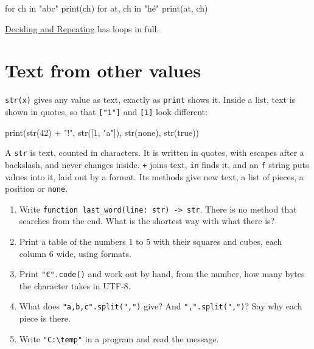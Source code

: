 \begin{zeno}
for ch in "abc" {
    print(ch)
}
for at, ch in "hé" {
    print(at, ch)
}
\end{zeno}

\hyperref[ch-control-flow]{Deciding and Repeating} has loops in full.

\section{Text from other values}

\verb|str(x)| gives any value as text, exactly as \verb|print| shows
it. Inside a list, text is shown in quotes, so that \verb|["1"]| and
\verb|[1]| look different:

\begin{zeno}
print(str(42) + "!", str([1, "a"]), str(none), str(true))
\end{zeno}

\begin{summary}
A \verb|str| is text, counted in characters. It is written in quotes,
with escapes after a backslash, and never changes inside. \verb|+|
joins text, \verb|in| finds it, and an \verb|f| string puts values into
it, laid out by a format. Its methods give new text, a list of pieces,
a position or \verb|none|.
\end{summary}

\begin{tryit}
\begin{enumerate}
\item Write \verb|function last_word(line: str) -> str|. There is no
  method that searches from the end. What is the shortest way with what
  there is?
\item Print a table of the numbers 1 to 5 with their squares and cubes,
  each column 6 wide, using formats.
\item Print \verb|"€".code()| and work out by hand, from the number,
  how many bytes the character takes in UTF-8.
\item What does \verb|"a,b,c".split(",")| give? And
  \verb|",".split(",")|? Say why each piece is there.
\item Write \verb|"C:\temp"| in a program and read the message.
\end{enumerate}
\end{tryit}
